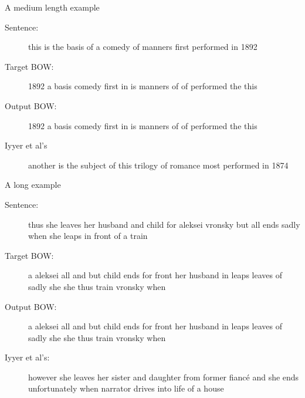 \documentclass[]{beamer}
\begin{document}
\begin{frame}{A medium length example}
	\begin{description}
		\item[Sentence:] this is the basis of a comedy of manners first performed in 1892
		\item[Target BOW:] 1892 a   basis   comedy  first   in  is  manners of  of  performed   the this
		\item[Output BOW:] 1892 a   basis   comedy  first   in  is  manners of  of  performed   the this   
		\vspace{1cm}
		\item[Iyyer et al's] another is the subject of this trilogy of romance most performed in 1874
	\end{description}
\end{frame}


\begin{frame}{A long example}
	\begin{description}
		\item[Sentence:] thus she leaves her husband and child for aleksei vronsky but all ends sadly when she leaps in front of a train
		\item[Target BOW:] a    aleksei all and but child   ends    for front   her husband in  leaps   leaves  of  sadly   she she thus    train   vronsky when
		\item[Output BOW:] a    aleksei all and but child   ends    for front   her husband in  leaps   leaves  of  sadly   she she thus    train   vronsky when
		\vspace{1cm}
		\item[Iyyer et al's:] however she leaves her sister and daughter from former fianc\'e and she ends unfortunately when narrator drives into life of a house 
	\end{description}
\end{frame}
\end{document}
